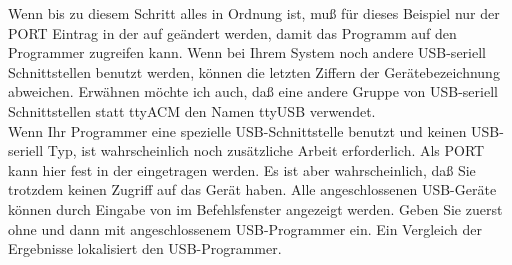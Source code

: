 Wenn bis zu diesem Schritt alles in Ordnung ist,
muß für dieses Beispiel nur der PORT Eintrag in der  auf
 geändert werden,
damit das  Programm auf den Programmer zugreifen kann.
Wenn bei Ihrem System noch andere USB-seriell Schnittstellen benutzt
werden, können die letzten Ziffern der Gerätebezeichnung abweichen.
Erwähnen möchte ich auch, daß eine andere Gruppe von USB-seriell
Schnittstellen statt ttyACM den Namen ttyUSB verwendet.\\

Wenn Ihr Programmer eine spezielle USB-Schnittstelle benutzt und
keinen USB-seriell Typ, ist wahrscheinlich noch zusätzliche
Arbeit erforderlich. Als PORT kann hier fest  in der 
eingetragen werden. Es ist aber wahrscheinlich, daß Sie trotzdem
keinen Zugriff auf das Gerät haben.
Alle angeschlossenen USB-Geräte können durch Eingabe von  im Befehlsfenster 
angezeigt werden.
Geben Sie  zuerst ohne und dann mit angeschlossenem USB-Programmer ein.
Ein Vergleich der Ergebnisse lokalisiert den USB-Programmer.

